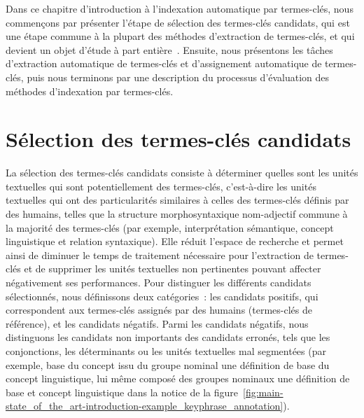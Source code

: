     Dans ce chapitre d'introduction à l'indexation automatique par termes-clés,
    nous commençons par présenter l'étape de sélection des termes-clés
    candidats, qui est une étape commune à la plupart des méthodes d'extraction
    de termes-clés, et qui devient un objet d'étude à part
    entière~\cite{wang2014keyphraseextractionpreprocessing}. Ensuite, nous
    présentons les tâches d'extraction automatique de termes-clés et
    d'assignement automatique de termes-clés, puis nous terminons par une
    description du processus d'évaluation des méthodes d'indexation par
    termes-clés.


  \section{Sélection des termes-clés candidats}
  \label{sec:main-state_of_the_art-keyphrase_candidate_selection}
    La sélection des termes-clés candidats consiste à déterminer quelles sont
    les unités textuelles qui sont potentiellement des termes-clés, c'est-à-dire
    les unités textuelles qui ont des particularités similaires à celles des
    termes-clés définis par des humains, telles que la structure
    morphosyntaxique nom-adjectif commune à la majorité des termes-clés
    (par exemple, \og{}interprétation sémantique\fg{}, \og{}concept
    linguistique\fg{} et
    \og{}relation syntaxique\fg{}). Elle réduit l'espace de recherche et permet
    ainsi de diminuer le temps de traitement nécessaire pour l'extraction de
    termes-clés et de supprimer les
    unités textuelles non pertinentes pouvant affecter négativement ses
    performances. Pour distinguer les différents candidats sélectionnés, nous
    définissons deux catégories~: les candidats positifs, qui
    correspondent aux termes-clés assignés par des humains (termes-clés de
    référence), et les candidats négatifs. Parmi les candidats négatifs,
    nous distinguons les candidats non importants des candidats erronés, tels que les conjonctions, les
    déterminants ou les unités textuelles mal segmentées (par exemple,
    \og{}base du concept\fg{} issu du groupe nominal \og{}une définition de base
    du concept linguistique\fg{}, lui même composé des groupes nominaux
    \og{}une définition de base\fg{} et \og{}concept linguistique\fg{} dans la
    notice de la
    figure~\ref{fig:main-state_of_the_art-introduction-example_keyphrase_annotation}).

